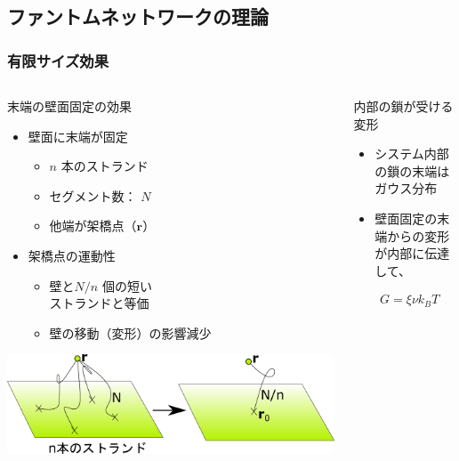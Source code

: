 \documentclass[12pt, dvipdfmx]{beamer}
\begin{document}
\subsection{ファントムネットワークの理論}
\begin{frame}
	\frametitle{有限サイズ効果}
		\begin{columns}[totalwidth=1\textwidth]
				\begin{block}{末端の壁面固定の効果}
				\begin{itemize}
					\item 壁面に末端が固定
						\begin{itemize}
							\item $n$ 本のストランド
							\item セグメント数： $N$
							\item 他端が架橋点（$\bm{r}$）
						\end{itemize}
					\item 架橋点の運動性
						\begin{itemize}
							\item 壁と$N/n$ 個の短い\\ストランドと等価
							\item 壁の移動（変形）の影響減少
						\end{itemize}
				\end{itemize}
				\begin{center}
					\includegraphics[width=.8\textwidth]{phantom-1.png}
				\end{center}
				\end{block}
				\begin{exampleblock}{内部の鎖が受ける変形}
					\begin{itemize}
						\item システム内部の鎖の末端はガウス分布
						\item 壁面固定の末端からの変形が内部に伝達して、
					\end{itemize}
					\vspace{-3mm}
					\tiny
					\begin{align*}
						&G=\xi \nu k_BT \\

\end{align*}
\end{exampleblock}
\end{columns}
\end{frame}
\end{document}
